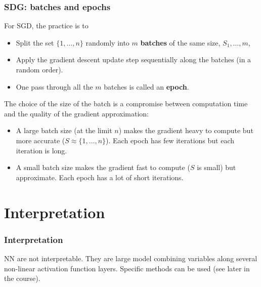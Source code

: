 \begin{frame}
\frametitle{SDG: batches and epochs}
For SGD, the practice is to
\begin{itemize}
\item Split the set $\{1,\ldots,n\}$ randomly into $m$ {\bf batches} of the same size, $S_1,\ldots,m$,
\item Apply the gradient descent update step sequentially along the batches (in a random order). 
\item One pass through all the $m$ batches is called an {\bf epoch}.
\end{itemize}
The choice of the size of the batch is a compromise between computation time and the quality of the gradient approximation:
\begin{itemize}
\item A large batch size (at the limit $n$) makes the gradient heavy to compute but more accurate ($S\approx \{1,\ldots,n\}$). Each epoch has few iterations but each iteration is long. 
\item A small batch size makes the gradient fast to compute ($S$ is small) but approximate. Each epoch has a lot of short iterations.
\end{itemize}
\end{frame}
\section{Interpretation}
\begin{frame}
\frametitle{Interpretation}
NN are not interpretable. They are large model combining variables along several non-linear activation function layers. Specific methods can be used (see later in the course).
\end{frame}
